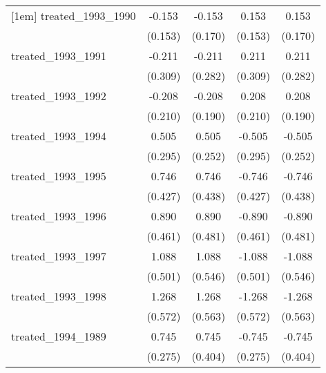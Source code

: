 {\begin{tabular}{l*{4}{c}}
[1em]
treated\_1993\_1990&      -0.153         &      -0.153         &       0.153         &       0.153         \\
            &     (0.153)         &     (0.170)         &     (0.153)         &     (0.170)         \\
[1em]
treated\_1993\_1991&      -0.211         &      -0.211         &       0.211         &       0.211         \\
            &     (0.309)         &     (0.282)         &     (0.309)         &     (0.282)         \\
[1em]
treated\_1993\_1992&      -0.208         &      -0.208         &       0.208         &       0.208         \\
            &     (0.210)         &     (0.190)         &     (0.210)         &     (0.190)         \\
[1em]
treated\_1993\_1994&       0.505         &       0.505\sym{*}  &      -0.505         &      -0.505\sym{*}  \\
            &     (0.295)         &     (0.252)         &     (0.295)         &     (0.252)         \\
[1em]
treated\_1993\_1995&       0.746         &       0.746         &      -0.746         &      -0.746         \\
            &     (0.427)         &     (0.438)         &     (0.427)         &     (0.438)         \\
[1em]
treated\_1993\_1996&       0.890         &       0.890         &      -0.890         &      -0.890         \\
            &     (0.461)         &     (0.481)         &     (0.461)         &     (0.481)         \\
[1em]
treated\_1993\_1997&       1.088\sym{*}  &       1.088\sym{*}  &      -1.088\sym{*}  &      -1.088\sym{*}  \\
            &     (0.501)         &     (0.546)         &     (0.501)         &     (0.546)         \\
[1em]
treated\_1993\_1998&       1.268\sym{*}  &       1.268\sym{*}  &      -1.268\sym{*}  &      -1.268\sym{*}  \\
            &     (0.572)         &     (0.563)         &     (0.572)         &     (0.563)         \\
[1em]
treated\_1994\_1989&       0.745\sym{**} &       0.745         &      -0.745\sym{**} &      -0.745         \\
            &     (0.275)         &     (0.404)         &     (0.275)         &     (0.404)         \\

\end{tabular}}
